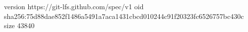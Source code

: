 version https://git-lfs.github.com/spec/v1
oid sha256:75d88dae852f1486a5491a7aca1431cbcd010244c91f20323fc6526757bc430c
size 43840

